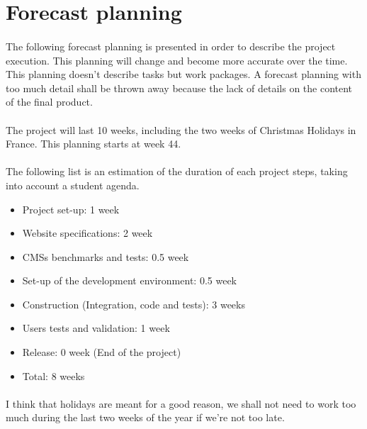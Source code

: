 \section{Forecast planning}

\paragraph{} The following forecast planning is presented in order to describe
the project execution. This planning will change and become more accurate over
the time. This planning doesn't describe tasks but work packages. A forecast
planning with too much detail shall be thrown away because the lack of details
on the content of the final product.

\paragraph{} The project will last 10 weeks, including the two weeks of
Christmas Holidays in France. This planning starts at week 44.

\paragraph{} The following list is an estimation of the duration of each project
steps, taking into account a student agenda.

\begin{itemize}
	\item Project set-up: 1 week
	\item Website specifications: 2 week
	\item CMSs benchmarks and tests: 0.5 week
	\item Set-up of the development environment: 0.5 week
	\item Construction (Integration, code and tests): 3 weeks
	\item Users tests and validation: 1 week
	\item Release: 0 week (End of the project)
	\item Total: 8 weeks
\end{itemize}

\paragraph{} I think that holidays are meant for a good reason, we shall not
need to work too much during the last two weeks of the year if we're not too
late.

